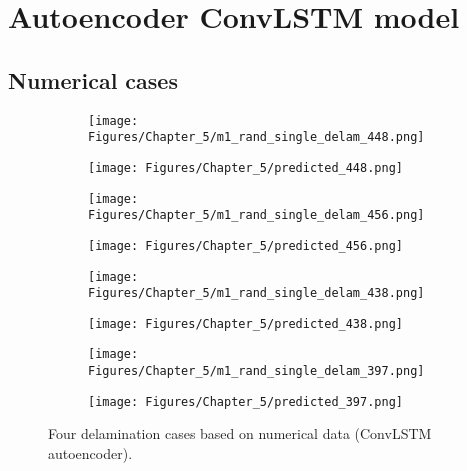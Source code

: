 \section{Autoencoder ConvLSTM model}
\label{sec53}

\subsection{Numerical cases}
\label{sec531}

\begin{figure} [!h]
	\centering
	\begin{subfigure}[b]{.48\textwidth}
		\centering
		\texttt{[image: Figures/Chapter\_5/m1\_rand\_single\_delam\_448.png]}
		\caption{}
		\label{fig:RMS_448}
	\end{subfigure}
	\hfill
	\begin{subfigure}[b]{.48\textwidth}
		\centering
		\texttt{[image: Figures/Chapter\_5/predicted\_448.png]}
		\caption{}
		\label{fig:convlstm_pred_448}	
	\end{subfigure}
	\hfill
	\begin{subfigure}[b]{.48\textwidth}
		\centering
		\texttt{[image: Figures/Chapter\_5/m1\_rand\_single\_delam\_456.png]}
		\caption{}
		\label{fig:RMS_456}
	\end{subfigure}
	\hfill
	\begin{subfigure}[b]{.48\textwidth}
		\centering
		\texttt{[image: Figures/Chapter\_5/predicted\_456.png]}
		\caption{}
		\label{fig:convlstm_pred_456}	
	\end{subfigure}
	\hfill
	\begin{subfigure}[b]{.48\textwidth}
		\centering
		\texttt{[image: Figures/Chapter\_5/m1\_rand\_single\_delam\_438.png]}
		\caption{}
		\label{fig:RMS_438}
	\end{subfigure}
	\hfill
	\begin{subfigure}[b]{.48\textwidth}
		\centering
		\texttt{[image: Figures/Chapter\_5/predicted\_438.png]}
		\caption{}
		\label{fig:convlstm_pred_438}	
	\end{subfigure}
	\hfill
	\begin{subfigure}[b]{.48\textwidth}
		\centering
		\texttt{[image: Figures/Chapter\_5/m1\_rand\_single\_delam\_397.png]}
		\caption{}
		\label{fig:RMS_397}
	\end{subfigure}
	\hfill
	\begin{subfigure}[b]{.48\textwidth}
		\centering
		\texttt{[image: Figures/Chapter\_5/predicted\_397.png]}
		\caption{}
		\label{fig:convlstm_pred_397}	
	\end{subfigure}
	\caption{Four delamination cases based on numerical data (ConvLSTM autoencoder).}
	\label{fig:Num_convlstm__case}
\end{figure}
\clearpage

